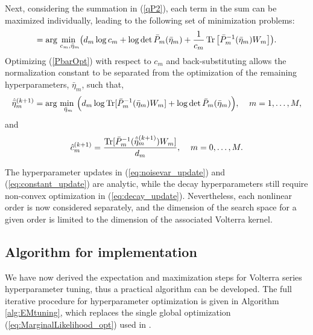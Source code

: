 Next, considering the summation in (\ref{qP2}), each term in the sum can be maximized individually, leading to the following set of minimization problems:
\begin{align}
[\hat{c}_m^{(k+1)} \; \hat{\bar{\eta}}_m^{(k+1)}] = \text{arg } \underset{c_m, \bar{\eta}_m}{\text{min }} \big( d_m \log c_m + \log \det \bar{P}_m(\bar{\eta}_m) + \frac{1}{c_m} \Tr \big[\bar{P}_m^{-1}(\bar{\eta}_m) W_{m}\big] \big). 
\label{PbarOpt} 
\end{align}
Optimizing (\ref{PbarOpt}) with respect to $c_m$ and back-substituting allows the normalization constant to be separated from the optimization of the remaining hyperparameters, $\bar{\eta}_m$, such that,
\begin{align}
\hat{\bar{\eta}}_m^{(k+1)} = \text{arg } \underset{\bar{\eta}_m}{\text{min }} \Big( d_m \log \operatorname{Tr} [\bar{P}_m^{-1}(\bar{\eta}_m)W_{m}] + \log \det \bar{P}_m(\bar{\eta}_m) \Big), \; \; \; \; m = 1,\hdots,M,
\label{eq:decay_update}
\end{align}
and
\begin{align}
\hat{c}_m^{(k+1)} = \frac{\operatorname{Tr} [\bar{P}_m^{-1}(\hat{\bar{\eta}}_m^{(k+1)})W_{m}]}{d_m}, \; \; \; \; m = 0,\hdots,M.
\label{eq:constant_update}
\end{align}

The hyperparameter updates in (\ref{eq:noisevar_update}) and (\ref{eq:constant_update}) are analytic, while the decay hyperparameters still require non-convex optimization in (\ref{eq:decay_update}). Nevertheless, each nonlinear order is now considered separately, and the dimension of the search space for a given order is limited to the dimension of the associated Volterra kernel.

\subsection{Algorithm for implementation}

We have now derived the expectation and maximization steps for Volterra series hyperparameter tuning, thus a practical algorithm can be developed. The full iterative procedure for hyperparameter optimization is given in Algorithm \ref{alg:EMtuning}, which replaces the single global optimization (\ref{eq:MarginalLikelihood_opt}) used in \cite{Birpoutsoukis2017}. 

